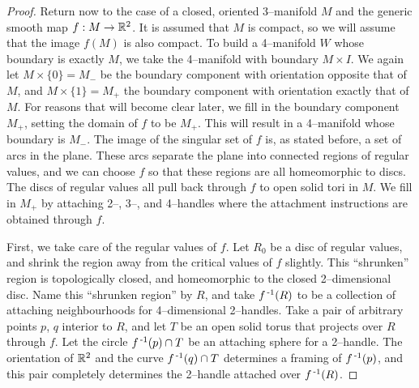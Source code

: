 \begin{proof}
Return now to the case of a closed, oriented 3--manifold $M$ and the generic smooth map $f:M\to \mathbb{R}^2$.
It is assumed that $M$ is compact, so we will assume that the image $f(M)$ is also compact.
To build a 4--manifold $W$ whose boundary is exactly $M$, we take the 4--manifold with boundary $M\times I$.
We again let $M\times \{0\}=M_-$ be the boundary component with orientation opposite that of $M$, and $M\times\{1\}=M_+$ the boundary component with orientation exactly that of $M$.
For reasons that will become clear later, we fill in the boundary component $M_+$, setting the domain of $f$ to be $M_+$.
This will result in a 4--manifold whose boundary is $M_-$.
The image of the singular set of $f$ is, as stated before, a set of arcs in the plane.
These arcs separate the plane into connected regions of regular values, and we can choose $f$ so that these regions are all homeomorphic to discs.
The discs of regular values all pull back through $f$ to open solid tori in $M$.
We fill in $M_+$ by attaching 2--, 3--, and 4--handles where the attachment instructions are obtained through $f$.

First, we take care of the regular values of $f$.
Let $R_0$ be a disc of regular values, and shrink the region away from the critical values of $f$ slightly.
This ``shrunken'' region is topologically closed, and homeomorphic to the closed 2--dimensional disc.
Name this ``shrunken region'' by $R$, and take $f^{\,\text{-}1} (R)$ to be a collection of attaching neighbourhoods for 4--dimensional 2--handles.
Take a pair of arbitrary points $p$, $q$ interior to $R$, and let $T$ be an open solid torus that projects over $R$ through $f$.
Let the circle $f^{\,\text{-}1} (p)\cap T$ be an attaching sphere for a 2--handle.
The orientation of $\mathbb{R}^2$ and the curve $f^{\,\text{-}1} (q)\cap T$ determines a framing of $f^{\,\text{-}1} (p)$, and this pair completely determines the 2--handle attached over $f^{\,\text{-}1} (R)$.


\end{proof}
